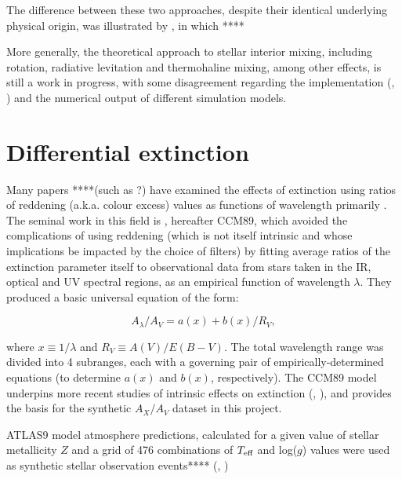\documentclass[12pt, a4paper]{report}
\begin{document}
The difference between these two approaches, despite their identical underlying physical origin, was illustrated by \cite{2010ApJ...723..563D}, in which ****

More generally, the theoretical approach to stellar interior mixing, including rotation, radiative levitation and thermohaline mixing, among other effects, is still a work in progress, with some disagreement regarding the implementation (\cite{2010ApJ...723..563D}, \cite{2013A&A...553A...1M}) and the numerical output \citep{2015MNRAS.446.2673L} of different simulation models.

\section{Differential extinction}
Many papers ****(such as ?) have examined the effects of extinction using ratios of reddening (a.k.a. colour excess) values as functions of wavelength primarily \citep{1988ApJ...328..734F}. The seminal work in this field is \cite{1989ApJ...345..245C}, hereafter CCM89, which avoided the complications of using reddening (which is not itself intrinsic and whose implications be impacted by the choice of filters) by fitting average ratios of the extinction parameter itself to observational data from stars taken in the IR, optical \citep{1988ESASP.281b.215C} and UV \citep{1988ApJ...328..734F} spectral regions, as an empirical function of wavelength $\lambda$. They produced a basic universal equation of the form:

\begin{equation}
A_{\lambda}/A_{V} = a(x) + b(x)/R_{V},
\label{CCM_general}
\end{equation}

where $x \equiv 1/\lambda$ and $R_{V} \equiv A(V)/E(B-V)$. The total wavelength range was divided into 4 subranges, each with a governing pair of empirically-determined equations (to determine $a(x)$ and $b(x)$, respectively). The CCM89 model underpins more recent studies of intrinsic effects on extinction (\cite{2008PASP..120..583G}, \cite{2018MNRAS.479L.102C}), and provides the basis for the synthetic $A_{X}/A_{V}$ dataset in this project.

ATLAS9 model atmosphere predictions, calculated for a given value of stellar metallicity $Z$ and a grid of 476 combinations of $T_{\textnormal{eff}}$ and log($g$) values \citep{2004astro.ph..5087C} were used as synthetic stellar observation events**** (\cite{1997A&A...318..841C}, \cite{1993KurCD..13.....K})
\end{document}

